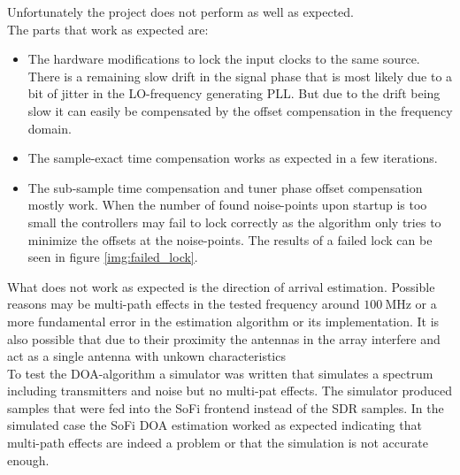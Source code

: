 Unfortunately the project does not perform as
well as expected. \\

\noindent
The parts that work as expected are:

\begin{itemize}
  \item
    The hardware modifications to lock the input clocks
    to the same source. \\
    There is a remaining slow drift in
    the signal phase that is most likely due to a bit of jitter
    in the LO-frequency generating PLL.
    But due to the drift being slow it can easily be compensated by
    the offset compensation in the frequency domain.

  \item
    The sample-exact time compensation works as expected in
    a few iterations.

  \item
    The sub-sample time compensation and tuner phase
    offset compensation mostly work.
    When the number of found noise-points upon startup
    is too small the controllers may fail to lock
    correctly as the algorithm only tries to minimize the
    offsets at the noise-points.
    The results of a failed lock can be seen in figure
    \ref{img:failed_lock}.
\end{itemize}

What does not work as expected is the direction
of arrival estimation. Possible reasons may be
multi-path effects in the tested frequency
around $\SI{100}{\mega\hertz}$ or a more
fundamental error in the estimation algorithm
or its implementation.
It is also possible that due to their proximity
the antennas in the array interfere and act
as a single antenna with unkown characteristics\\

To test the DOA-algorithm a simulator
was written that simulates a spectrum
including transmitters and noise but no
multi-pat effects.
The simulator produced samples that were
fed into the SoFi frontend instead of the
SDR samples.
In the simulated case the SoFi DOA estimation
worked as expected indicating that multi-path
effects are indeed a problem or that the simulation
is not accurate enough.
